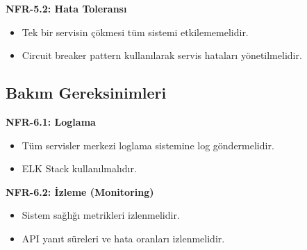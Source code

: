 \textbf{NFR-5.2: Hata Toleransı}
\begin{itemize}
    \item Tek bir servisin çökmesi tüm sistemi etkilememelidir.
    \item Circuit breaker pattern kullanılarak servis hataları yönetilmelidir.
\end{itemize}

\subsection{Bakım Gereksinimleri}
\textbf{NFR-6.1: Loglama}
\begin{itemize}
    \item Tüm servisler merkezi loglama sistemine log göndermelidir.
    \item ELK Stack kullanılmalıdır.
\end{itemize}

\textbf{NFR-6.2: İzleme (Monitoring)}
\begin{itemize}
    \item Sistem sağlığı metrikleri izlenmelidir.
    \item API yanıt süreleri ve hata oranları izlenmelidir.
\end{itemize}
